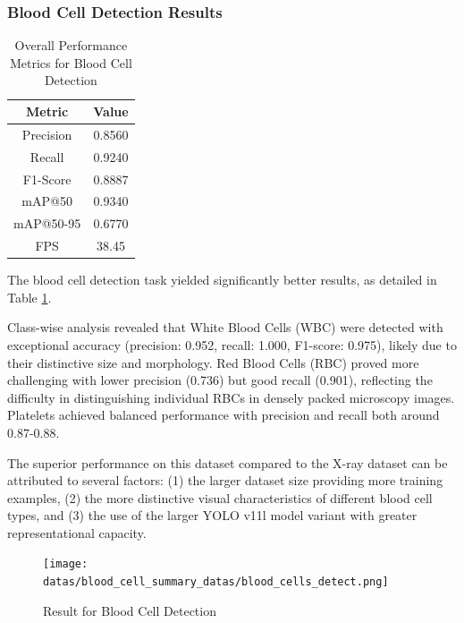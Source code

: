 \vspace{2.5in}


\subsubsection{Blood Cell Detection Results}

\begin{table}[ht]
\centering
\begin{tabular}{|c|c|}
\hline
\textbf{Metric} & \textbf{Value} \\
\hline
Precision & 0.8560 \\
Recall & 0.9240 \\
F1-Score & 0.8887 \\
mAP@50 & 0.9340 \\
mAP@50-95 & 0.6770 \\
FPS & 38.45 \\
\hline
\end{tabular}
\caption{Overall Performance Metrics for Blood Cell Detection}
\label{tab:blood_cell_results}
\end{table}

\begin{multicols}{2}
The blood cell detection task yielded significantly better results, as detailed in Table \ref{tab:blood_cell_results}.

Class-wise analysis revealed that White Blood Cells (WBC) were detected with exceptional accuracy (precision: 0.952, recall: 1.000, F1-score: 0.975), likely due to their distinctive size and morphology. Red Blood Cells (RBC) proved more challenging with lower precision (0.736) but good recall (0.901), reflecting the difficulty in distinguishing individual RBCs in densely packed microscopy images. Platelets achieved balanced performance with precision and recall both around 0.87-0.88.
\end{multicols}

\begin{multicols}{2}
The superior performance on this dataset compared to the X-ray dataset can be attributed to several factors: (1) the larger dataset size providing more training examples, (2) the more distinctive visual characteristics of different blood cell types, and (3) the use of the larger YOLO v11l model variant with greater representational capacity.
\end{multicols}

\begin{figure}[ht]
\centering
\texttt{[image: datas/blood\_cell\_summary\_datas/blood\_cells\_detect.png]}
\caption{Result for Blood Cell Detection}
\label{fig:blood_cell_class_metrics}
\end{figure}

